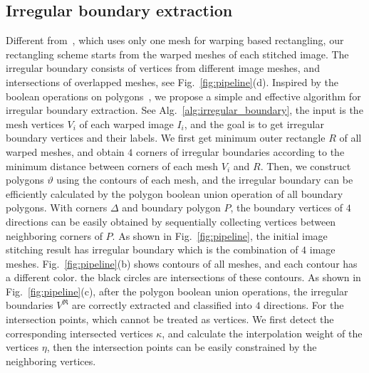 \documentclass[10pt,journal,compsoc]{IEEEtran}
\begin{document}
\subsection{Irregular boundary extraction}
 \label{sec:irregular_boundary}
Different from~\cite{journals/tog/HeC013}, which uses only one mesh for warping based rectangling, our rectangling scheme starts from the warped meshes of each stitched image.
The irregular boundary consists of vertices from different image meshes, and intersections of overlapped meshes, see Fig.~\ref{fig:pipeline}(d).
Inspired by the boolean operations on polygons~\cite{journals/gandc/MartinezRF09}, we propose a simple and effective algorithm for irregular boundary extraction.
See Alg.~\ref{alg:irregular_boundary}, the input is the mesh vertices $V_i$ of each warped image $I_i$, and the goal is to get irregular boundary vertices and their labels.
We first get minimum outer rectangle $R$ of all warped meshes, and obtain $4$ corners of irregular boundaries according to the minimum distance between corners of each mesh $V_i$ and $R$.
Then, we construct polygons $\vartheta$  using the contours of each mesh, and the irregular boundary can be efficiently calculated by the polygon boolean union operation of all boundary polygons.
With corners $\Delta$ and boundary polygon $P$, the boundary vertices of $4$ directions can be easily obtained by sequentially collecting vertices between neighboring corners of $P$.
As shown in Fig.~\ref{fig:pipeline}, the initial image stitching result has irregular boundary which is the combination of $4$ image meshes.
Fig.~\ref{fig:pipeline}(b) shows contours of all meshes, and each contour has a different color.  the black circles are intersections of these contours.
As shown in Fig.~\ref{fig:pipeline}(c), after the polygon boolean union operations, the irregular boundaries $V^{\Re}$ are correctly extracted and classified into $4$ directions.
For the intersection points, which cannot be treated as vertices. We first detect the corresponding intersected vertices $\kappa$, and calculate the interpolation weight of the vertices $\eta$,
then the intersection points can be easily constrained by the neighboring vertices.
\end{document}
